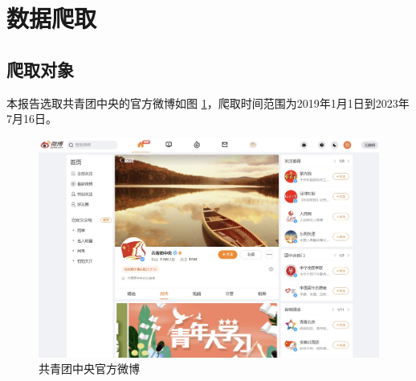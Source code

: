 \section{数据爬取}
\subsection{爬取对象}
本报告选取共青团中央的官方微博如图 \ref{fig:gqtzy}，爬取时间范围为2019年1月1日到2023年7月16日。

\begin{figure}[H]
    \centering
    \includegraphics[width=12cm]{figure/gqtzy.jpg}
    \caption{共青团中央官方微博} \label{fig:gqtzy}
\end{figure}

